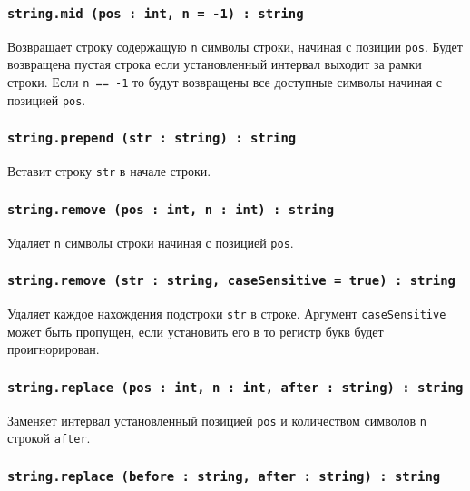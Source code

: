 \subsubsection{\texttt{string.mid (pos : int, n = -1) : string}}

Возвращает строку содержащую \texttt{n} символы строки, начиная с позиции \texttt{pos}. Будет возвращена пустая строка если установленный интервал выходит за рамки строки. Если \texttt{n == -1} то будут возвращены все доступные символы начиная с позицией \texttt{pos}.

\subsubsection{\texttt{string.prepend (str : string) : string}}

Вставит строку \texttt{str} в начале строки.

\subsubsection{\texttt{string.remove (pos : int, n : int) : string}}

Удаляет \texttt{n} символы строки начиная с позицией \texttt{pos}.

\subsubsection{\texttt{string.remove (str : string, caseSensitive = true) : string}}

Удаляет каждое нахождения подстроки \texttt{str} в строке. Аргумент \texttt{caseSensitive} может быть пропущен, если установить его в \false{} то регистр букв будет проигнорирован.

\subsubsection{\texttt{string.replace (pos : int, n : int, after : string) : string}}

Заменяет интервал установленный позицией \texttt{pos} и количеством символов \texttt{n} строкой \texttt{after}.

\subsubsection{\texttt{string.replace (before : string, after : string) : string}}

